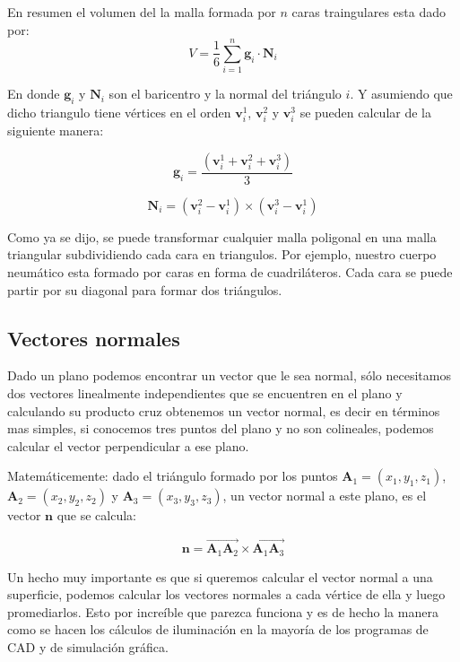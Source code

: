 En resumen el volumen del la malla formada por $n$ caras traingulares esta dado por:
\begin{equation}
V = \frac{1}{6} \sum_{i=1}^{n} \textbf{g}_i \cdot \textbf{N}_i
\label{eq:volumen}
\end{equation}

En donde $\textbf{g}_i$ y $\textbf{N}_i$ son el baricentro y la normal del triángulo $i$. Y asumiendo que dicho triangulo tiene vértices en el orden $\textbf{v}_{i}^{1}$, $\textbf{v}_{i}^{2}$ y $\textbf{v}_{i}^{3}$ se pueden calcular de la siguiente manera:

\begin{equation}
\textbf{g}_{i} = \frac{(\textbf{v}_{i}^{1} + \textbf{v}_{i}^{2} + \textbf{v}_{i}^{3})}{3}
\label{eq:baricentro}
\end{equation}

\begin{equation}
\textbf{N}_i = (\textbf{v}_{i}^{2} - \textbf{v}_{i}^{1}) \times (\textbf{v}_{i}^{3} - \textbf{v}_{i}^{1})
\label{eq:normTriag}
\end{equation}

Como ya se dijo, se puede transformar cualquier malla poligonal en una malla triangular subdividiendo cada cara en triangulos.
Por ejemplo, nuestro cuerpo neumático esta formado por caras en forma de cuadriláteros.
Cada cara se puede partir por su diagonal para formar dos triángulos.

\subsection{Vectores normales}
Dado un plano podemos encontrar un vector que le sea normal, sólo necesitamos dos vectores linealmente independientes que se encuentren en el plano y calculando su producto cruz obtenemos un vector normal, es decir en términos mas simples, si conocemos tres puntos del plano y no son colineales, podemos calcular el vector perpendicular a ese plano.

Matemáticemente: dado el triángulo formado por los puntos $\textbf{A}_1 = (x_1, y_1, z_1)$, $\textbf{A}_2 = (x_2, y_2, z_2)$ y $\textbf{A}_3 = (x_3, y_3, z_3)$, un vector normal a este plano, es el vector $\textbf{n}$ que se calcula:

$$ \textbf{n} = \overrightarrow{\textbf{A}_1 \textbf{A}_2} \times \overrightarrow{\textbf{A}_1 \textbf{A}_3}$$

Un hecho muy importante es que si queremos calcular el vector normal a una superficie, podemos calcular los vectores normales a cada vértice de ella y luego promediarlos.
Esto por increíble que parezca funciona y es de hecho la manera como se hacen los cálculos de iluminación en la mayoría de los programas de CAD y de simulación gráfica.

